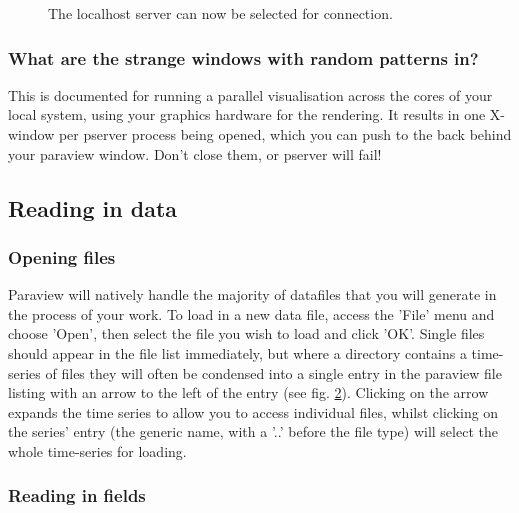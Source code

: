 \begin{figure}[h!]
\label{fig:paraview5}
  \centering
\caption{The localhost server can now be selected for connection.}
\end{figure}

 

\subsubsection{What are the strange windows with random patterns in?}

This is documented for running a parallel visualisation across the cores of your local system, using your graphics hardware for the rendering. It results in one X-window per pserver process being opened, which you can push to the back behind your paraview window. Don't close them, or pserver will fail! 

\subsection{Reading in data}

\subsubsection{Opening files}

Paraview will natively handle the majority of datafiles that you will generate in the process of your work. To load in a new data file, access the 'File' menu and choose 'Open', then select the file you wish to load and click 'OK'. Single files should appear in the file list immediately, but where a directory contains a time-series of files they will often be condensed into a single entry in the paraview file listing with an arrow to the left of the entry (see fig. \ref{paraview6}). Clicking on the arrow expands the time series to allow you to access individual files, whilst clicking on the series' entry (the generic name, with a '..' before the file type) will select the whole time-series for loading. 

\begin{figure}[h!]
\label{paraview6}
  \centering
\end{figure}

\subsubsection{Reading in fields}

